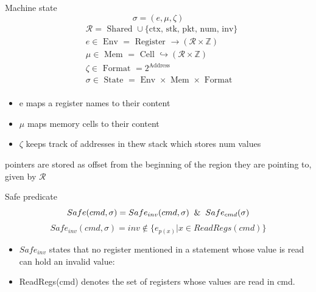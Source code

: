 \documentclass[aspectratio=169]{beamer}
\begin{document}
\begin{frame}{Machine state}
$$\sigma = (e, \mu, \zeta)$$
$$
\begin{aligned}
& \mathcal{R}=\text { Shared } \cup\{\text {ctx, stk, pkt, num, inv}\} \\
& e \in \text { Env } =\text { Register } \rightarrow(\mathcal{R} \times \mathbb{Z}) \\
& \mu \in \text { Mem } =\text { Cell } \hookrightarrow(\mathcal{R} \times \mathbb{Z}) \\
& \zeta \in \text { Format }=2^{\text {Address }} \\
& \sigma \in \text { State }=\text { Env } \times \text { Mem } \times \text { Format } \\
&
\end{aligned}
$$
\begin{itemize}
    \item e maps a register names to their content
    \item $\mu$ maps memory cells to their content
    \item $\zeta$ keeps track of addresses in thew stack which stores num values
 \end{itemize}
 pointers are stored as offset from the beginning of the region they are pointing to, given by $\mathcal{R}$

\end{frame}

\begin{frame}{Safe predicate}
   $$ Safe(cmd, \sigma ) = Safe_{inv} (cmd, \sigma ) \And Safe_{cmd} (\sigma) $$
   $$Safe_{inv}(cmd, \sigma) = inv \notin \{ {e_{p(x)} | x \in ReadRegs(cmd)\}}$$
   \begin{itemize}
    \item $Safe_{inv}$ states that no register mentioned
in a statement whose value is read can hold an invalid value:
\item ReadRegs(cmd) denotes the set of registers whose
values are read in cmd.
\end{itemize}
\end{frame}
\end{document}
